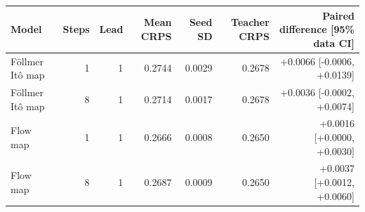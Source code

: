 \begin{tabular}{lrrrrrr}
\toprule
Model & Steps & Lead & Mean CRPS & Seed SD & Teacher CRPS & Paired difference [95\% data CI] \\
\midrule
Föllmer Itô map & 1 & 1 & 0.2744 & 0.0029 & 0.2678 & +0.0066 [-0.0006, +0.0139] \\
Föllmer Itô map & 8 & 1 & 0.2714 & 0.0017 & 0.2678 & +0.0036 [-0.0002, +0.0074] \\
Flow map & 1 & 1 & 0.2666 & 0.0008 & 0.2650 & +0.0016 [+0.0000, +0.0030] \\
Flow map & 8 & 1 & 0.2687 & 0.0009 & 0.2650 & +0.0037 [+0.0012, +0.0060] \\
\bottomrule
\end{tabular}
